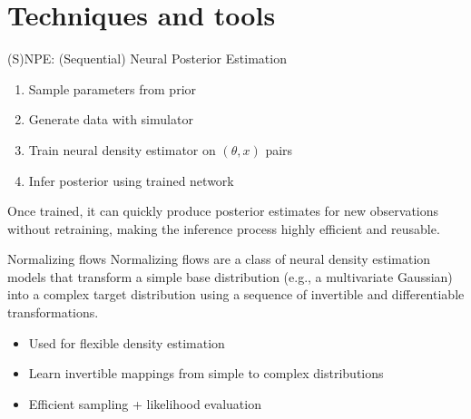 \documentclass{beamer}
\begin{document}
\section{Techniques and tools}
\begin{frame}{(S)NPE: (Sequential) Neural Posterior Estimation}
\begin{enumerate}
\item Sample parameters from prior
\item Generate data with simulator
\item Train neural density estimator on $(\theta, x)$ pairs
\item Infer posterior using trained network
\end{enumerate}
Once trained, it can quickly produce posterior estimates for new observations without retraining, making the inference process highly efficient and reusable.
\end{frame}

\begin{frame}{Normalizing flows}
Normalizing flows are a class of neural density estimation models that transform a simple base distribution (e.g., a multivariate Gaussian) into a complex target distribution using a sequence of invertible and differentiable transformations.
\begin{itemize}
\item Used for flexible density estimation
\item Learn invertible mappings from simple to complex distributions
\item Efficient sampling + likelihood evaluation
\end{itemize}
\end{frame}
\end{document}
